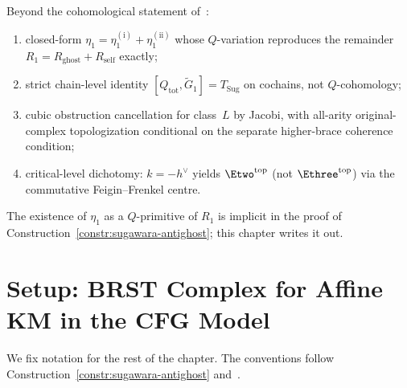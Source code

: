 \begin{remark}
\label{rem:topol-new}
Beyond the cohomological statement of~\cite{CFG2602,KhanZeng25}:
\begin{enumerate}
 \item closed-form $\eta_1 = \eta_1^{(\mathrm i)} + \eta_1^{(\mathrm{ii})}$
 whose $Q$-variation reproduces the remainder
 $R_1 = R_{\mathrm{ghost}} + R_{\mathrm{self}}$ exactly;
 \item strict chain-level identity
 $[Q_{\mathrm{tot}}, \widetilde G_1] = T_{\mathrm{Sug}}$ on
 cochains, not $Q$-cohomology;
 \item cubic obstruction cancellation for class~$L$ by
 Jacobi, with all-arity original-complex topologization
 conditional on the separate higher-brace coherence
 condition;
 \item critical-level dichotomy:
 $k = -h^\vee$ yields $\Etwo^{\mathrm{top}}$ (not
 $\Ethree^{\mathrm{top}}$) via the commutative Feigin--Frenkel
 centre.
\end{enumerate}
The existence of $\eta_1$ as a $Q$-primitive of $R_1$ is implicit
in the proof of Construction~\ref{constr:sugawara-antighost}; this
chapter writes it out.
\end{remark}

\section{Setup: BRST Complex for Affine KM in the CFG Model}
\label{sec:setup-brst-affine-km}

We fix notation for the rest of the chapter. The conventions follow
Construction~\ref{constr:sugawara-antighost} and~\cite{CG1}.

